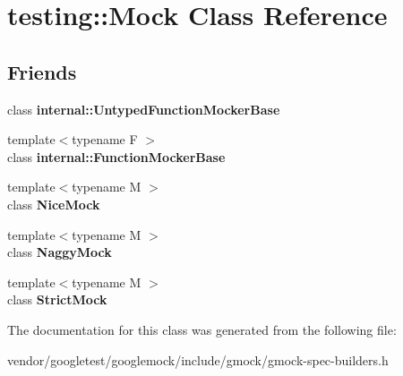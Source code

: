 \hypertarget{classtesting_1_1_mock}{}\section{testing\+:\+:Mock Class Reference}
\label{classtesting_1_1_mock}
\subsection*{Friends}
\begin{DoxyCompactItemize}
\item 
\mbox{\label{classtesting_1_1_mock_aa199ba5b2fe114afc42c43912a582feb}} 
class {\bfseries internal\+::\+Untyped\+Function\+Mocker\+Base}
\item 
\mbox{\label{classtesting_1_1_mock_a1945aea400fdb50639e5cdf43c583687}} 
{\footnotesize template$<$typename F $>$ }\\class {\bfseries internal\+::\+Function\+Mocker\+Base}
\item 
\mbox{\label{classtesting_1_1_mock_a9e796f79d4c876398f83aa7678dddc46}} 
{\footnotesize template$<$typename M $>$ }\\class {\bfseries Nice\+Mock}
\item 
\mbox{\label{classtesting_1_1_mock_aee2e427ecb34e6662477add3bb5f8819}} 
{\footnotesize template$<$typename M $>$ }\\class {\bfseries Naggy\+Mock}
\item 
\mbox{\label{classtesting_1_1_mock_a88b3d71476c27b82c88bd49e8297e20e}} 
{\footnotesize template$<$typename M $>$ }\\class {\bfseries Strict\+Mock}
\end{DoxyCompactItemize}


The documentation for this class was generated from the following file\+:\begin{DoxyCompactItemize}
\item 
vendor/googletest/googlemock/include/gmock/gmock-\/spec-\/builders.\+h\end{DoxyCompactItemize}
